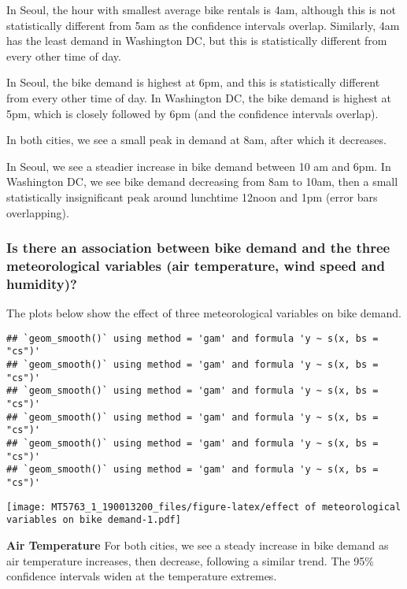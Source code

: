 \documentclass[]{article}
\begin{document}
In Seoul, the hour with smallest average bike rentals is 4am, although
this is not statistically different from 5am as the confidence intervals
overlap. Similarly, 4am has the least demand in Washington DC, but this
is statistically different from every other time of day.

In Seoul, the bike demand is highest at 6pm, and this is statistically
different from every other time of day. In Washington DC, the bike
demand is highest at 5pm, which is closely followed by 6pm (and the
confidence intervals overlap).

In both cities, we see a small peak in demand at 8am, after which it
decreases.

In Seoul, we see a steadier increase in bike demand between 10 am and
6pm. In Washington DC, we see bike demand decreasing from 8am to 10am,
then a small statistically insignificant peak around lunchtime 12noon
and 1pm (error bars overlapping).

\hypertarget{is-there-an-association-between-bike-demand-and-the-three-meteorological-variables-air-temperature-wind-speed-and-humidity}{%
\subsubsection{Is there an association between bike demand and the three
meteorological variables (air temperature, wind speed and
humidity)?}\label{is-there-an-association-between-bike-demand-and-the-three-meteorological-variables-air-temperature-wind-speed-and-humidity}}

The plots below show the effect of three meteorological variables on
bike demand.

\begin{verbatim}
## `geom_smooth()` using method = 'gam' and formula 'y ~ s(x, bs = "cs")'
## `geom_smooth()` using method = 'gam' and formula 'y ~ s(x, bs = "cs")'
## `geom_smooth()` using method = 'gam' and formula 'y ~ s(x, bs = "cs")'
## `geom_smooth()` using method = 'gam' and formula 'y ~ s(x, bs = "cs")'
## `geom_smooth()` using method = 'gam' and formula 'y ~ s(x, bs = "cs")'
## `geom_smooth()` using method = 'gam' and formula 'y ~ s(x, bs = "cs")'
\end{verbatim}

\texttt{[image: MT5763\_1\_190013200\_files/figure-latex/effect of meteorological variables on bike demand-1.pdf]}

\textbf{Air Temperature} For both cities, we see a steady increase in
bike demand as air temperature increases, then decrease, following a
similar trend. The 95\% confidence intervals widen at the temperature
extremes.
\end{document}
